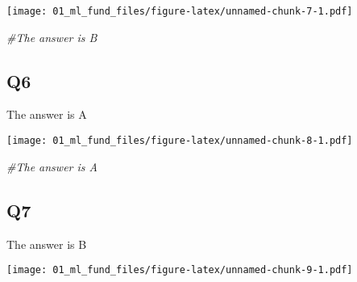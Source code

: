 \documentclass[
]{article}
\newenvironment{Shaded}{\begin{snugshade}}{\end{snugshade}}
\newcommand{\CommentTok}[1]{\textcolor[rgb]{0.56,0.35,0.01}{\textit{#1}}}
\newcommand{\KeywordTok}[1]{\textcolor[rgb]{0.13,0.29,0.53}{\textbf{#1}}}
\newcommand{\NormalTok}[1]{#1}
\newcommand{\OperatorTok}[1]{\textcolor[rgb]{0.81,0.36,0.00}{\textbf{#1}}}
\newcommand{\StringTok}[1]{\textcolor[rgb]{0.31,0.60,0.02}{#1}}
\begin{document}
\texttt{[image: 01\_ml\_fund\_files/figure-latex/unnamed-chunk-7-1.pdf]}

\begin{Shaded}
\begin{Highlighting}[]
\CommentTok{#The answer is B}
\end{Highlighting}
\end{Shaded}

\hypertarget{q6}{%
\subsection{Q6}\label{q6}}

The answer is A

\begin{Shaded}
\end{Shaded}

\texttt{[image: 01\_ml\_fund\_files/figure-latex/unnamed-chunk-8-1.pdf]}

\begin{Shaded}
\begin{Highlighting}[]
\CommentTok{#The answer is A}
\end{Highlighting}
\end{Shaded}

\hypertarget{q7}{%
\subsection{Q7}\label{q7}}

The answer is B

\begin{Shaded}
\end{Shaded}

\texttt{[image: 01\_ml\_fund\_files/figure-latex/unnamed-chunk-9-1.pdf]}
\end{document}
